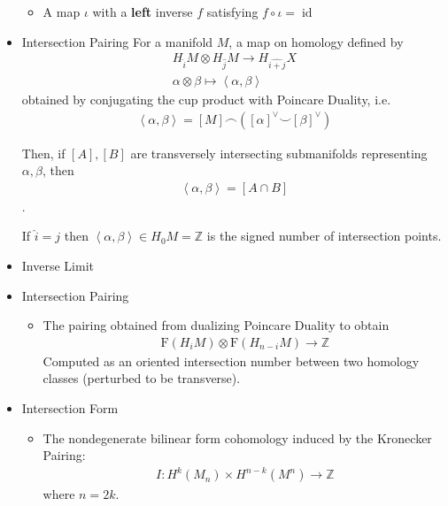 \begin{itemize}
  \begin{itemize}
  \tightlist
  \item
    A map \(\iota\) with a \textbf{left} inverse \(f\) satisfying
    \(f\circ \iota = \operatorname{id}\)
  \end{itemize}
\item
  Intersection Pairing For a manifold \(M\), a map on homology defined
  by
  \begin{align*}
    H_{\widehat{i}}M \otimes H_{\widehat{j}}M \to H_{\widehat{i+j}}X\\
    \alpha\otimes\beta \mapsto \left< \alpha, \beta \right>
    \end{align*}
  obtained by conjugating the cup product with Poincare Duality, i.e.~
  \begin{align*}\left< \alpha, \beta \right> = [M] \frown ([\alpha]^\vee\smile [\beta]^\vee)\end{align*}

  Then, if \([A], [B]\) are transversely intersecting submanifolds
  representing \(\alpha, \beta\), then
  \begin{align*}\left<\alpha, \beta\right> = [A\cap B]\end{align*}
  .

  If \(\widehat{i} = j\) then
  \(\left< \alpha, \beta \right> \in H_0 M = {\mathbb{Z}}\) is the
  signed number of intersection points.
\item
  Inverse Limit
\item
  Intersection Pairing

  \begin{itemize}
  \tightlist
  \item
    The pairing obtained from dualizing Poincare Duality to obtain
    \begin{align*}\mathrm{F}(H_i M) \otimes\mathrm{F}(H_{n-i}M) \to {\mathbb{Z}}\end{align*}
    Computed as an oriented intersection number between two homology
    classes (perturbed to be transverse).
  \end{itemize}
\item
  Intersection Form

  \begin{itemize}
  \tightlist
  \item
    The nondegenerate bilinear form cohomology induced by the Kronecker
    Pairing:
    \begin{align*}I: H^k(M_n) \times H^{n-k}(M^n) \to {\mathbb{Z}}\end{align*}
    where \(n=2k\).


\end{itemize}
\end{itemize}
